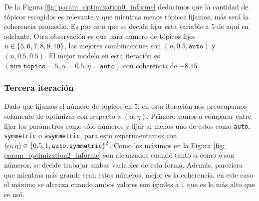 \documentclass{article}
\begin{document}
 	De la Figura \ref{fig: param_optimization0_informe} deducimos que la cantidad de tópicos escogidos es relevante y que mientras menos tópicos fijamos, más será la coherencia promedio. Es por esto que se decide fijar esta variable a $5$ de aquí en adelante. Otra observación es que para número de tópicos fijos $n\in\left\{5,6,7,8,9,10\right\}$, las mejores combinaciones son $(n, 0.5, \texttt{auto})$ y $(n, 0.5, 0.5)$. El mejor modelo en esta iteración es $(\texttt{num\_topics}=5,\alpha= 0.5, \eta=\texttt{auto})$ con coherencia de $-8.15$.
 	
 \subsubsection{Tercera iteración}
	Dado que fijamos el número de tópicos en $5$, en esta iteración nos preocupamos solamente de optimizar con respecto a $(\alpha, \eta)$. Primero vamos a comparar entre fijar los parámetros como sólo números y fijar al menos uno de estos como \texttt{auto}, \texttt{symmetric} o \texttt{asymmetric}, para esto experimentamos con $(\alpha, \eta)\in\left\{0.5, 1,\texttt{auto}, \texttt{symmetric}\right\}^2$. Como los máximos en la Figura \ref{fig: param_optimization2_informe} son alcanzados cuando tanto $\alpha$ como $\eta$ son números, se decide trabajar ambas variables de esta forma. Además, pareciera que mientras más grande sean estos números, mejor es la coherencia, en este caso el máximo se alcanza cuando ambos valores son iguales a $1$ que es lo más alto que se usó.
	
\end{document}
